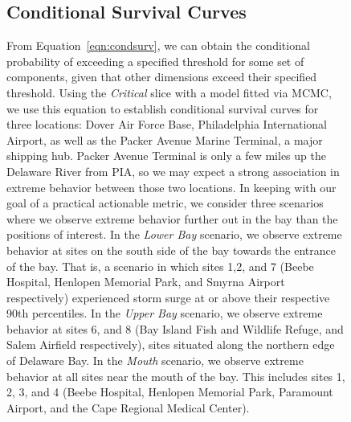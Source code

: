 \begin{figure}[ht]
\subsection{Conditional Survival Curves}
From Equation~\ref{eqn:condsurv}, we can obtain the conditional probability of
    exceeding a specified threshold for some set of components, given that other dimensions exceed their specified 
    threshold. Using the \emph{Critical} slice with a model fitted via MCMC, we use this equation to establish 
    conditional survival curves for three locations: Dover Air Force Base, Philadelphia International Airport, 
    as well as the Packer Avenue Marine Terminal, a major shipping hub.  Packer Avenue Terminal is only a few 
    miles up the Delaware River from PIA, so we may expect a strong association in extreme behavior between 
    those two locations. In keeping with our goal of a practical actionable metric, we 
    consider three scenarios where we observe extreme behavior further out in the bay than the positions of
    interest.  In the \emph{Lower Bay} scenario, we observe extreme behavior at sites on the south side of the 
    bay towards the entrance of the bay.  That is, a scenario in which sites 1,2, and 7 (Beebe Hospital, 
    Henlopen Memorial Park, and Smyrna Airport respectively) experienced storm surge at or above their
    respective 90th percentiles.  In the \emph{Upper Bay} scenario, we observe extreme behavior at sites 6,
    and 8 (Bay Island Fish and Wildlife Refuge, and Salem Airfield respectively), sites situated along the
    northern edge of Delaware Bay.  In the \emph{Mouth} scenario, we observe extreme behavior at all sites near
    the mouth of the bay.  This includes sites 1, 2, 3, and 4 (Beebe Hospital, Henlopen Memorial Park, 
    Paramount Airport, and the Cape Regional Medical Center). 


\end{figure}
